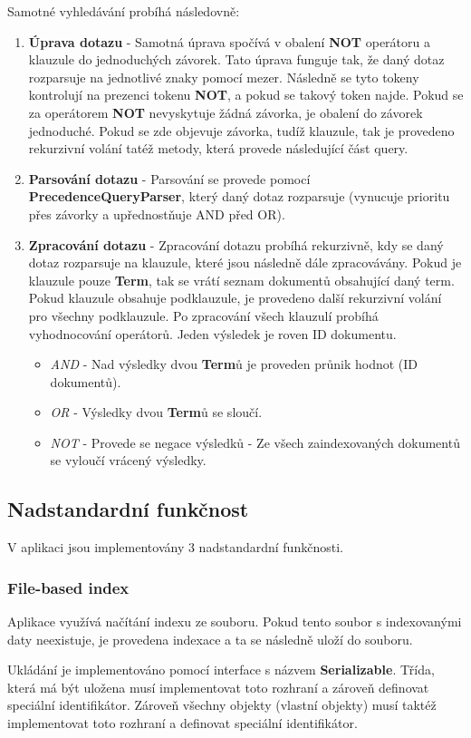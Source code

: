 \documentclass[12pt, a4paper]{article}
\begin{document}
Samotné vyhledávání probíhá následovně:
\begin{enumerate}
\item \textbf{Úprava dotazu} - Samotná úprava spočívá v obalení \textbf{NOT} operátoru a klauzule do jednoduchých závorek. Tato úprava funguje tak, že daný dotaz rozparsuje na jednotlivé znaky pomocí mezer. Následně se tyto tokeny kontrolují na prezenci tokenu \textbf{NOT}, a pokud se takový token najde. Pokud se za operátorem \textbf{NOT} nevyskytuje žádná závorka, je obalení do závorek jednoduché. Pokud se zde objevuje závorka, tudíž klauzule, tak je provedeno rekurzivní volání tatéž metody, která provede následující část query.
\item \textbf{Parsování dotazu} - Parsování se provede pomocí \textbf{PrecedenceQueryParser}, který daný dotaz rozparsuje (vynucuje prioritu přes závorky a upřednostňuje AND před OR).
\item \textbf{Zpracování dotazu} - Zpracování dotazu probíhá rekurzivně, kdy se daný dotaz rozparsuje na klauzule, které jsou následně dále zpracovávány. Pokud je klauzule pouze \textbf{Term}, tak se vrátí seznam dokumentů obsahující daný term. Pokud klauzule obsahuje podklauzule, je provedeno další rekurzivní volání pro všechny podklauzule. Po zpracování všech klauzulí probíhá vyhodnocování operátorů. Jeden výsledek je roven ID dokumentu.
	\begin{itemize}
	\item \textit{AND} - Nad výsledky dvou \textbf{Term}ů je proveden průnik hodnot (ID dokumentů).
	\item \textit{OR} - Výsledky dvou \textbf{Term}ů se sloučí.
	\item \textit{NOT} - Provede se negace výsledků - Ze všech zaindexovaných dokumentů se vyloučí vrácený výsledky.
	\end{itemize} 
\end{enumerate}
\subsection{Nadstandardní funkčnost}
V aplikaci jsou implementovány 3 nadstandardní funkčnosti.
\subsubsection{File-based index}
Aplikace využívá načítání indexu ze souboru. Pokud tento soubor s indexovanými daty neexistuje, je provedena indexace a ta se následně uloží do souboru.

Ukládání je implementováno pomocí interface s názvem \textbf{Serializable}. Třída, která má být uložena musí implementovat toto rozhraní a zároveň definovat speciální identifikátor. Zároveň  všechny objekty (vlastní objekty) musí taktéž implementovat toto rozhraní a definovat speciální identifikátor.
\end{document}
